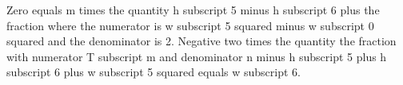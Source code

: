 Zero equals m times the quantity h subscript 5 minus h subscript 6 plus the fraction where the numerator is w subscript 5 squared minus w subscript 0 squared and the denominator is 2. Negative two times the quantity the fraction with numerator T subscript m and denominator n minus h subscript 5 plus h subscript 6 plus w subscript 5 squared equals w subscript 6.